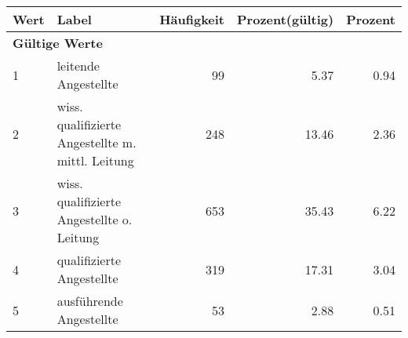      \begin{longtable}{lXrrr}
     \toprule
     \textbf{Wert} & \textbf{Label} & \textbf{Häufigkeit} & \textbf{Prozent(gültig)} & \textbf{Prozent} \\
     \endhead
     \midrule
     \multicolumn{5}{l}{\textbf{Gültige Werte}}\\

     1 &
     \multicolumn{1}{X}{ leitende Angestellte   } &


       \num{99} &
       \num[round-mode=places,round-precision=2]{5.37} &
         \num[round-mode=places,round-precision=2]{0.94} \\

     2 &
     \multicolumn{1}{X}{ wiss. qualifizierte Angestellte m. mittl. Leitung   } &


       \num{248} &
       \num[round-mode=places,round-precision=2]{13.46} &
         \num[round-mode=places,round-precision=2]{2.36} \\

     3 &
     \multicolumn{1}{X}{ wiss. qualifizierte Angestellte o. Leitung   } &


       \num{653} &
       \num[round-mode=places,round-precision=2]{35.43} &
         \num[round-mode=places,round-precision=2]{6.22} \\

     4 &
     \multicolumn{1}{X}{ qualifizierte Angestellte   } &


       \num{319} &
       \num[round-mode=places,round-precision=2]{17.31} &
         \num[round-mode=places,round-precision=2]{3.04} \\

     5 &
     \multicolumn{1}{X}{ ausführende Angestellte   } &


       \num{53} &
       \num[round-mode=places,round-precision=2]{2.88} &
         \num[round-mode=places,round-precision=2]{0.51} \\


\end{longtable}

